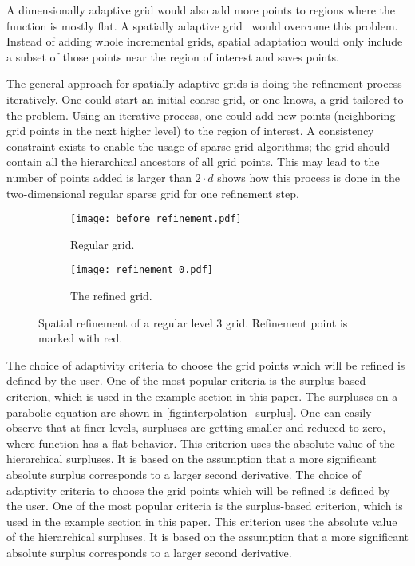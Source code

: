 A dimensionally adaptive grid would also add more points to regions where the function is mostly flat.
A spatially adaptive grid~\cite{pflueger10spatially} would overcome this problem. Instead of adding whole incremental grids,
spatial adaptation would only include a subset of those points near the region of interest and saves points.

The general approach for spatially adaptive grids is doing the refinement process iteratively. One could start an initial coarse grid, or one knows, a grid tailored to the problem. Using an iterative process, one could add new points (neighboring grid points in the next higher level) to the region of interest. A consistency constraint exists to enable the usage of sparse grid algorithms; the grid should contain all the hierarchical ancestors of all grid points. This may lead to the number of points added is larger than \( 2 \cdot d \)  shows how this process is done in the two-dimensional regular sparse grid for one refinement step.

\begin{figure}
    \centering
    \begin{subfigure}{0.22\textwidth}
        \texttt{[image: before\_refinement.pdf]}
        \caption{Regular grid.}
        \label{fig:regularlevel3}
    \end{subfigure}%
    \begin{subfigure}{0.22\textwidth}
        \texttt{[image: refinement\_0.pdf]}
        \caption{The refined grid.}
    \end{subfigure}
    \caption{Spatial refinement of a regular level 3 grid. Refinement point is marked with red.}
    \label{fig:spatialrefinement}
\end{figure}

The choice of adaptivity criteria to choose the grid points which will be refined is defined by the user. One of the most popular criteria is the surplus-based criterion, which is used in the example section in this paper. The surpluses on a parabolic equation are shown in \cref{fig:interpolation_surplus}. One can easily observe that at finer levels, surpluses are getting smaller and reduced to zero, where function has a flat behavior. This criterion uses the absolute value of the hierarchical surpluses. It is based on the assumption that a more significant absolute surplus corresponds to a larger second derivative. The choice of adaptivity criteria to choose the grid points which will be refined is defined by the user. One of the most popular criteria is the surplus-based criterion, which is used in the example section in this paper. This criterion uses the absolute value of the hierarchical surpluses. It is based on the assumption that a more significant absolute surplus corresponds to a larger second derivative.